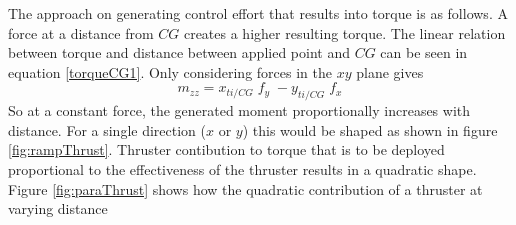 The approach on generating control effort that results into torque is as follows. A force at a distance from $CG$ creates a higher resulting torque. The linear relation between torque and distance between applied point and $CG$ can be seen in equation \ref{torqueCG1}. Only considering forces in the $xy$ plane gives
\begin{equation}
	m_{zz} = x_{ti/CG} \; f_{y}  \; -  y_{ti/CG} \; f_{x}
	\label{mzz3dof}
\end{equation}
So at a constant force, the generated moment proportionally increases with distance. For a single direction ($x$ or $y$) this would be shaped as shown in figure \ref{fig:rampThrust}. Thruster contibution to torque that is to be deployed proportional to the effectiveness of the thruster results in a quadratic shape. Figure \ref{fig:paraThrust} shows how the quadratic contribution of a thruster at varying distance

\begin{figure}[H]
	\centering
\end{figure}

